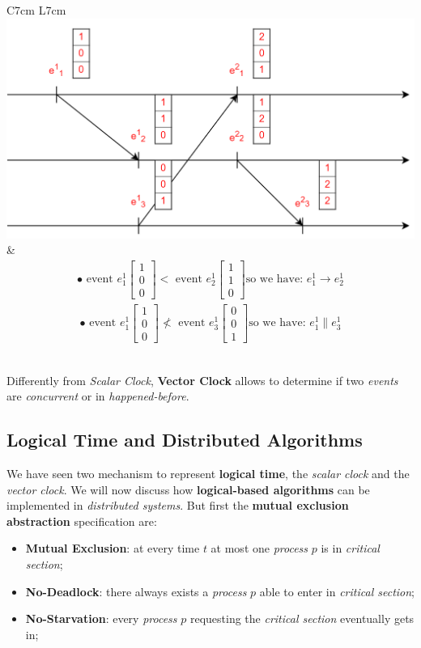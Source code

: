 \documentclass{article}
\begin{document}
\begin{tabular}{C{7cm}  L{7cm}}
\includegraphics[scale=0.55, left]{cattura16.png}
&
\begin{align*}
\text{$\bullet$ event $e_1^1$}
\begin{bmatrix}
1\\0\\0
\end{bmatrix}
\text {$<$ event $e_2^1$}
\begin{bmatrix}
1\\1\\0
\end{bmatrix}
\text{so we have: $e_1^1\rightarrow e_2^1$}
\end{align*}
\begin{align*}
\text{$\bullet$ event $e_1^1$}
\begin{bmatrix}
1\\0\\0
\end{bmatrix}
\text {$\nless$ event $e_3^1$}
\begin{bmatrix}
0\\0\\1
\end{bmatrix}
\text{so we have: $e_1^1\parallel e_3^1$}
\end{align*}
\end{tabular}\\
Differently from \emph{Scalar Clock}, \textbf{Vector Clock} allows to determine if two \emph{events} are \emph{concurrent} or in \emph{happened-before}.
\subsection{Logical Time and Distributed Algorithms}
We have seen two mechanism to represent \textbf{logical time}, the \emph{scalar clock} and the \emph{vector clock}. We will now discuss how \textbf{logical-based algorithms} can be implemented in \emph{distributed systems}. But first the \textbf{mutual exclusion abstraction} specification are:
\begin{itemize}
\item \textbf{Mutual Exclusion}: at every time $t$ at most one \emph{process} $p$ is in \emph{critical section};
\item \textbf{No-Deadlock}: there always exists a \emph{process} $p$ able to enter in \emph{critical section};
\item \textbf{No-Starvation}: every \emph{process} $p$ requesting the \emph{critical section} eventually gets in;
\end{itemize}
\end{document}
